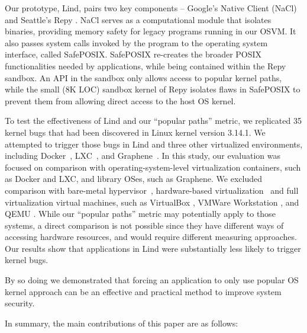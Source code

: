 Our prototype, Lind, pairs two key components -- Google's Native Client
(NaCl) \cite{NaCl-09} and Seattle's Repy \cite{Repy-10}.
NaCl serves as a computational module that isolates
binaries, providing memory safety for legacy programs running in our OSVM.
It also passes system calls invoked by the program to the operating system interface, called SafePOSIX.
SafePOSIX re-creates the broader POSIX functionalities needed by applications, while being contained within the Repy sandbox. 
An API in the sandbox only allows access to popular kernel paths, while
the small (8K LOC) sandbox kernel of Repy isolates flaws in SafePOSIX
to prevent them from allowing direct access to the host OS kernel.

To test the effectiveness of Lind and our ``popular paths'' metric, 
we replicated 35 kernel bugs that had been
discovered in Linux kernel version 3.14.1.  We attempted to trigger those
bugs in Lind and three other virtualized environments,
including Docker~\cite{Docker}, LXC~\cite{LXC}, and Graphene~\cite{Graphene-14}. 
In this study, our evaluation was focused on comparison with operating-system-level virtualization containers, such as Docker and LXC, 
and library OSes, such as Graphene. 
We excluded comparison with bare-metal hypervisor~\cite{Xen-03, VMWare-Server}, 
hardware-based virtualization~\cite{IntelVT, keller2010nohype} and full virtualization 
virtual machines, such as VirtualBox \cite{VirtualBox}, VMWare Workstation \cite{VMWare-Workstation}, and QEMU \cite{QEMU}. 
While our ``popular paths'' metric may potentially apply to those
systems, a direct comparison is not possible since they have different 
ways of accessing hardware resources, and would require different measuring approaches.
Our results show that applications in Lind were substantially less likely to trigger
kernel bugs.

By so doing we demonstrated that forcing an application to only use popular
OS kernel approach can be an effective and practical method to improve
system security.

In summary, the main contributions of this paper are as follows:

